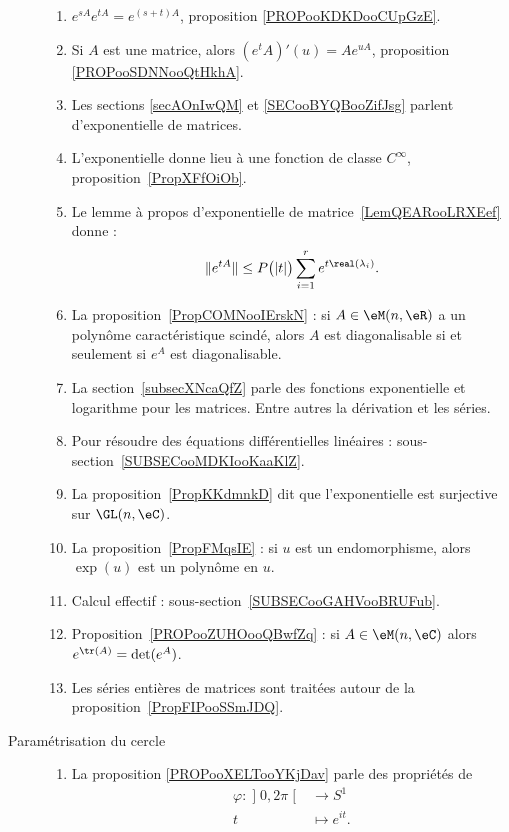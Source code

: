 \begin{description}
		\begin{enumerate}
			\item
			      \( e^{sA} e^{tA}= e^{(s+t)A}\), proposition \ref{PROPooKDKDooCUpGzE}.
			\item
			      Si \( A\) est une matrice, alors \( (e^tA)'(u)=Ae^{uA}\), proposition \ref{PROPooSDNNooQtHkhA}.
			\item
			      Les sections \ref{secAOnIwQM} et \ref{SECooBYQBooZifJsg} parlent d'exponentielle de matrices.
			\item
			      L'exponentielle donne lieu à une fonction de classe \(  C^{\infty}\), proposition~\ref{PropXFfOiOb}.
			\item
			      Le lemme à propos d'exponentielle de matrice~\ref{LemQEARooLRXEef} donne :
			      \begin{equation*}
				      \|  e^{tA} \|\leq P\big( | t | \big)\sum_{i=1}^r e^{t\real(\lambda_i)}.
			      \end{equation*}
			\item
			      La proposition~\ref{PropCOMNooIErskN} : si \( A\in \eM(n,\eR)\) a un polynôme caractéristique scindé, alors \( A\) est diagonalisable si et seulement si \( e^A\) est diagonalisable.
			\item
			      La section~\ref{subsecXNcaQfZ} parle des fonctions exponentielle et logarithme pour les matrices. Entre autres la dérivation et les séries.
			\item
			      Pour résoudre des équations différentielles linéaires : sous-section~\ref{SUBSECooMDKIooKaaKlZ}.
			\item
			      La proposition~\ref{PropKKdmnkD} dit que l'exponentielle est surjective sur \( \GL(n,\eC)\).
			\item

			      La proposition~\ref{PropFMqsIE} : si \( u\) est un endomorphisme, alors \( \exp(u)\) est un polynôme en \( u\).
			\item
			      Calcul effectif : sous-section~\ref{SUBSECooGAHVooBRUFub}.
			\item Proposition~\ref{PROPooZUHOooQBwfZq} : si \( A\in\eM(n,\eC)\) alors \( e^{\tr(A)}=\det( e^{A})\).
			\item
			      Les séries entières de matrices sont traitées autour de la proposition~\ref{PropFIPooSSmJDQ}.
		\end{enumerate}

	\item[Paramétrisation du cercle]
		\begin{enumerate}
			\item
			      La proposition \ref{PROPooXELTooYKjDav} parle des propriétés de
			      \begin{equation}
				      \begin{aligned}
					      \varphi\colon \mathopen] 0,2\pi\mathclose[ & \to S^1         \\
					      t                                          & \mapsto e^{it}.
				      \end{aligned}
			      \end{equation}
		\end{enumerate}

\end{description}
